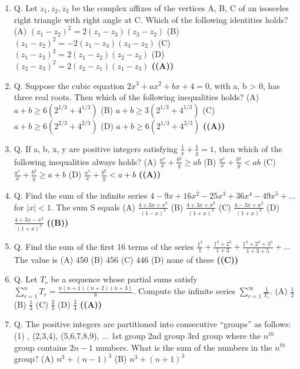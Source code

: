 \documentclass{article}
\begin{document}
\begin{enumerate}
$\frac{a-x}{px} = \frac{a-y}{qy} = \frac{a-z}{rz}$
If p, q, r are in arithmetic progression, then x, y, z are in
(A) arithmetic progression (A.P.)
(B) geometric progression (G.P.)
(C) harmonic progression (H.P.)
(D) none of these \hfill \textbf{((C))}
\item Q. Let $z_1, z_2, z_3$ be the complex affixes of the vertices A, B, C of an isosceles right triangle with right angle at C. Which of the following identities holds?
(A) $(z_1-z_2)^2 = 2(z_1-z_3) (z_3-z_2)$
(B) $(z_1-z_2)^2 = -2(z_1-z_3) (z_3-z_2)$
(C) $(z_1-z_3)^2 = 2(z_1-z_2) (z_2-z_3)$
(D) $(z_2-z_3)^2 = 2 (z_2-z_1) (z_1-z_3)$ \hfill \textbf{((A))}
\item Q. Suppose the cubic equation
$2x^3 + ax^2 + bx + 4 = 0$,
with a, b > 0, has three real roots. Then which of the following inequalities holds?
(A) $a+b \ge 6(2^{1/3} + 4^{1/3})$
(B) $a+b \ge 3(2^{1/3} + 4^{1/3})$
(C) $a+b \ge 6(2^{2/3} + 4^{2/3})$
(D) $a+b \ge 6(2^{1/3} + 4^{2/3})$ \hfill \textbf{((A))}
\item Q. If a, b, x, y are positive integers satisfying
$\frac{1}{x} + \frac{1}{y} = 1$,
then which of the following inequalities always holds?
(A) $\frac{a^x}{x} + \frac{b^y}{y} \ge ab$
(B) $\frac{a^x}{x} + \frac{b^y}{y} < ab$
(C) $\frac{a^x}{x} + \frac{b^y}{y} \ge a+b$
(D) $\frac{a^x}{x} + \frac{b^y}{y} < a+b$ \hfill \textbf{((A))}
\item Q. Find the sum of the infinite series
$4 - 9x + 16x^2 - 25x^3 + 36x^4 - 49x^5 + ...$
for $|x| < 1$. The sum S equals
(A) $\frac{4 + 3x + x^2}{(1-x)^3}$
(B) $\frac{4 + 3x + x^2}{(1+x)^3}$
(C) $\frac{4- 3x + x^2}{(1+x)^3}$
(D) $\frac{4+ 3x - x^2}{(1+x)^3}$ \hfill \textbf{((B))}
\item Q. Find the sum of the first 16 terms of the series
$\frac{1^3}{1} + \frac{1^3 + 2^3}{1+3} + \frac{1^3 + 2^3 + 3^3}{1+3+5} + ...$
The value is
(A) 450
(B) 456
(C) 446
(D) none of these \hfill \textbf{((C))}
\item Q. Let $T_r$ be a sequence whose partial sums satisfy
$\sum_{r=1}^{n} T_r = \frac{n(n+1)(n+2)(n+3)}{8}$.
Compute the infinite series
$\sum_{r=1}^{\infty} \frac{1}{T_r}$.
(A) $\frac{1}{2}$
(B) $\frac{1}{3}$
(C) $\frac{2}{3}$
(D) $\frac{3}{4}$ \hfill \textbf{((A))}
\item Q. The positive integers are partitioned into consecutive “groups” as follows:
(1) , (2,3,4), (5,6,7,8,9), ...
1st group 2nd group 3rd group
where the $n^{th}$ group contains $2n - 1$ numbers. What is the sum of the numbers in the $n^{th}$ group?
(A) $n^3 + (n - 1)^3$
(B) $n^3 + (n + 1)^3$

\end{enumerate}
\end{document}
